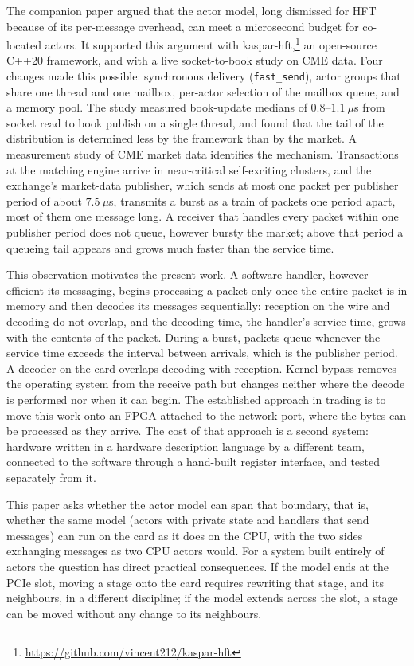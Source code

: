 \documentclass[11pt]{article}
\newcommand{\fs}{\texttt{fast\_send}}
\begin{document}
The companion paper \cite{fastsend} argued that the actor model, long
dismissed for HFT because of its per-message overhead, can meet a microsecond
budget for co-located actors. It supported this argument with
kaspar-hft,\footnote{\url{https://github.com/vincent212/kaspar-hft}} an
open-source C++20 framework, and with a live socket-to-book study on CME data.
Four changes made this possible: synchronous delivery (\fs{}), actor groups
that share one thread and one mailbox, per-actor selection of the mailbox
queue, and a memory pool. The study measured book-update medians of
$0.8$--$1.1~\mu$s from socket read to book publish on a single thread, and
found that the tail of the distribution is determined less by the framework
than by the market. A measurement study of CME market data \cite{mdarrival}
identifies the mechanism. Transactions at the matching engine arrive in
near-critical self-exciting clusters, and the exchange's market-data publisher,
which sends at most one packet per publisher period of about $7.5~\mu$s,
transmits a burst as a train of packets one period apart, most of them one
message long. A receiver that handles every packet within one publisher period
does not queue, however bursty the market; above that period a queueing tail
appears and grows much faster than the service time.

This observation motivates the present work. A software handler, however
efficient its messaging, begins processing a packet only once the entire packet
is in memory and then decodes its messages sequentially: reception on the wire
and decoding do not overlap, and the decoding time, the handler's service time,
grows with the contents of the packet. During a burst, packets queue whenever
the service time exceeds the interval between arrivals, which is the publisher
period. A decoder on the card overlaps decoding with reception. Kernel bypass
removes the operating system from the receive path but changes neither where
the decode is performed nor when it can begin. The established approach in
trading is to move this work onto an FPGA attached to the network port, where
the bytes can be processed as they arrive. The cost of that approach is a second
system: hardware written in a hardware description language by a different
team, connected to the software through a hand-built register interface, and
tested separately from it.

This paper asks whether the actor model can span that boundary, that is,
whether the same model (actors with private state and handlers that send
messages) can run on the card as it does on the CPU, with the two sides
exchanging messages as two CPU actors would. For a system built entirely of
actors the question has direct practical consequences. If the model ends at the
PCIe slot, moving a stage onto the card requires rewriting that stage, and its
neighbours, in a different discipline; if the model extends across the slot, a
stage can be moved without any change to its neighbours.
\end{document}
